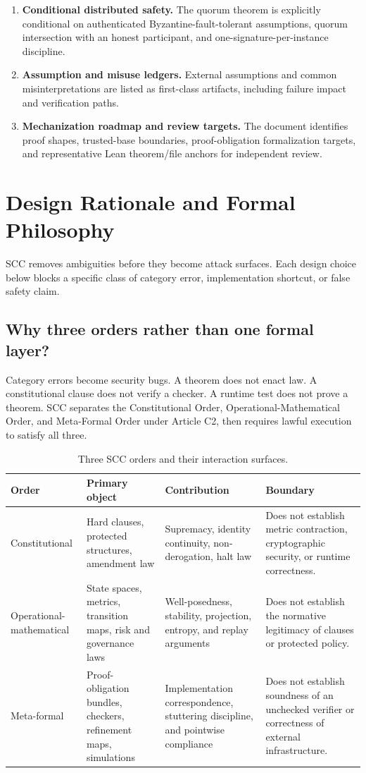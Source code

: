 \documentclass[10pt,oneside]{article}
\theoremstyle{definition}
\theoremstyle{remark}
\begin{document}
\begin{enumerate}
  \item \textbf{Conditional distributed safety.} The quorum theorem is explicitly conditional on authenticated Byzantine-fault-tolerant assumptions, quorum intersection with an honest participant, and one-signature-per-instance discipline.
  \item \textbf{Assumption and misuse ledgers.} External assumptions and common misinterpretations are listed as first-class artifacts, including failure impact and verification paths.
  \item \textbf{Mechanization roadmap and review targets.} The document identifies proof shapes, trusted-base boundaries, proof-obligation formalization targets, and representative Lean theorem/file anchors for independent review.
\end{enumerate}


\section{Design Rationale and Formal Philosophy}
SCC removes ambiguities before they become attack surfaces. Each design choice below blocks a specific class of category error, implementation shortcut, or false safety claim.

\subsection{Why three orders rather than one formal layer?}
Category errors become security bugs. A theorem does not enact law. A constitutional clause does not verify a checker. A runtime test does not prove a theorem. SCC separates the Constitutional Order, Operational-Mathematical Order, and Meta-Formal Order under Article C2, then requires lawful execution to satisfy all three.

\begin{table}[h]
\centering
\caption{Three SCC orders and their interaction surfaces.}
\label{tab:three-orders}
\small
\renewcommand{\arraystretch}{1.15}
\begin{tabularx}{\textwidth}{@{}p{}YYY@{}}
\toprule
Order & Primary object & Contribution & Boundary \\
\midrule
Constitutional & Hard clauses, protected structures, amendment law & Supremacy, identity continuity, non-derogation, halt law & Does not establish metric contraction, cryptographic security, or runtime correctness. \\
Operational-mathematical & State spaces, metrics, transition maps, risk and governance laws & Well-posedness, stability, projection, entropy, and replay arguments & Does not establish the normative legitimacy of clauses or protected policy. \\
Meta-formal & Proof-obligation bundles, checkers, refinement maps, simulations & Implementation correspondence, stuttering discipline, and pointwise compliance & Does not establish soundness of an unchecked verifier or correctness of external infrastructure. \\
\bottomrule
\end{tabularx}
\end{table}
\end{document}
